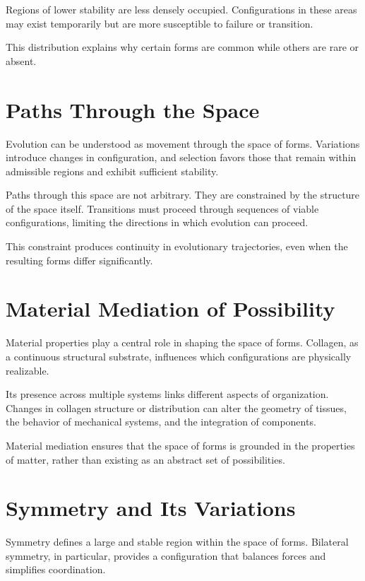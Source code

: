 \documentclass[11pt,oneside]{book}
\begin{document}
Regions of lower stability are less densely occupied. Configurations in these areas may exist temporarily but are more susceptible to failure or transition.

This distribution explains why certain forms are common while others are rare or absent.

\section{Paths Through the Space}

Evolution can be understood as movement through the space of forms. Variations introduce changes in configuration, and selection favors those that remain within admissible regions and exhibit sufficient stability.

Paths through this space are not arbitrary. They are constrained by the structure of the space itself. Transitions must proceed through sequences of viable configurations, limiting the directions in which evolution can proceed.

This constraint produces continuity in evolutionary trajectories, even when the resulting forms differ significantly.

\section{Material Mediation of Possibility}

Material properties play a central role in shaping the space of forms. Collagen, as a continuous structural substrate, influences which configurations are physically realizable.

Its presence across multiple systems links different aspects of organization. Changes in collagen structure or distribution can alter the geometry of tissues, the behavior of mechanical systems, and the integration of components.

Material mediation ensures that the space of forms is grounded in the properties of matter, rather than existing as an abstract set of possibilities.

\section{Symmetry and Its Variations}

Symmetry defines a large and stable region within the space of forms. Bilateral symmetry, in particular, provides a configuration that balances forces and simplifies coordination.
\end{document}
